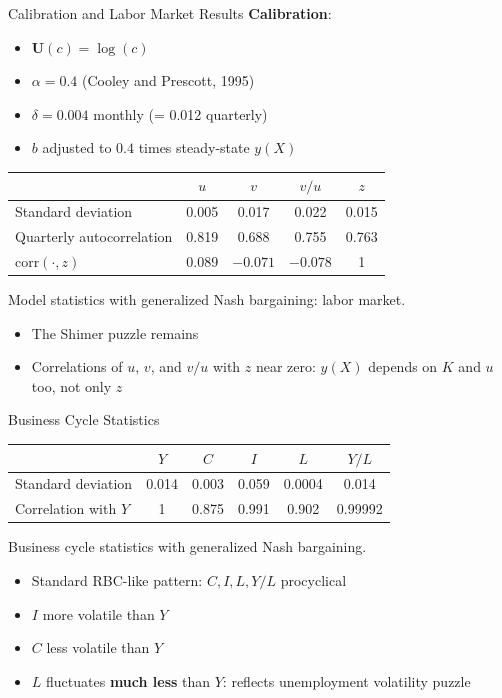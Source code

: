 \documentclass[blue]{beamer}
\begin{document}
\begin{frame}{Calibration and Labor Market Results}
	\textbf{Calibration}:
	\begin{itemize}
		\item $\mathbf{U}(c) = \log(c)$
		\item $\alpha = 0.4$ (Cooley and Prescott, 1995)
		\item $\delta = 0.004$ monthly (= 0.012 quarterly)
		\item $b$ adjusted to $0.4$ times steady-state $y(X)$
	\end{itemize}
	
	\begin{table}
		\centering
		\small
		\begin{tabular}{lcccc}
			\toprule
			& $u$ & $v$ & $v/u$ & $z$ \\
			\midrule
			Standard deviation & 0.005 & 0.017 & 0.022 & 0.015 \\
			Quarterly autocorrelation & 0.819 & 0.688 & 0.755 & 0.763 \\
			$\text{corr}(\cdot, z)$ & 0.089 & $-0.071$ & $-0.078$ & 1 \\
			\bottomrule
		\end{tabular}
		
		Model statistics with generalized Nash bargaining: labor market.
	\end{table}
	
	
	\begin{itemize}
		\item The Shimer puzzle remains
		\item Correlations of $u$, $v$, and $v/u$ with $z$ near zero: $y(X)$ depends on $K$ and $u$ too, not only $z$
	\end{itemize}
	\end{frame}
	
	\begin{frame}{Business Cycle Statistics}
		\begin{table}
			\centering
			\small
			\begin{tabular}{lccccc}
				\toprule
				& $Y$ & $C$ & $I$ & $L$ & $Y/L$ \\
				\midrule
				Standard deviation & 0.014 & 0.003 & 0.059 & 0.0004 & 0.014 \\
				Correlation with $Y$ & 1 & 0.875 & 0.991 & 0.902 & 0.99992 \\
				\bottomrule
			\end{tabular}
			
		Business cycle statistics with generalized Nash bargaining.
		\end{table}
		
		\bigskip
		\begin{itemize}
			\item Standard RBC-like pattern: $C, I, L, Y/L$ procyclical
			\item $I$ more volatile than $Y$
			\item $C$ less volatile than $Y$
			\item $L$ fluctuates \textbf{much less} than $Y$: reflects unemployment volatility puzzle
		\end{itemize}
	\end{frame}
	
\end{document}
